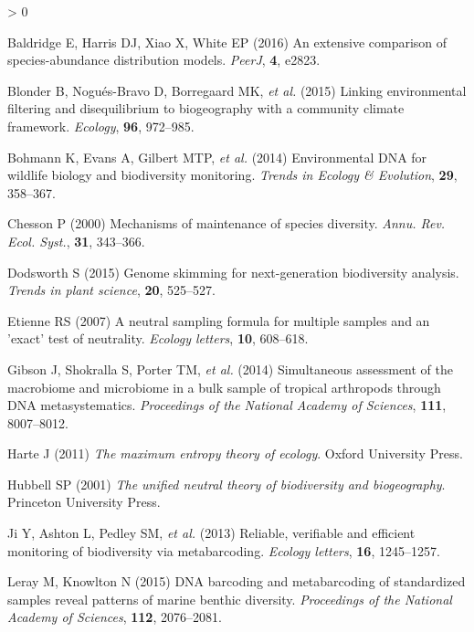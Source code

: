 \documentclass[
]{article}
\newlength{\cslhangindent}
\newenvironment{CSLReferences}[2] %
 {%
  \setlength{\parindent}{0pt}
  \ifodd #1 \everypar{\setlength{\hangindent}{\cslhangindent}}\ignorespaces\fi
  \ifnum #2 > 0
  \setlength{\parskip}{#2\baselineskip}
  \fi
 }%
 {}
\begin{document}
\hypertarget{refs}{}
\begin{CSLReferences}{1}{0}
\leavevmode\hypertarget{ref-baldridge2016}{}%
Baldridge E, Harris DJ, Xiao X, White EP (2016) An extensive comparison
of species-abundance distribution models. \emph{PeerJ}, \textbf{4},
e2823.

\leavevmode\hypertarget{ref-blonder2015}{}%
Blonder B, Nogués-Bravo D, Borregaard MK, \emph{et al.} (2015) Linking
environmental filtering and disequilibrium to biogeography with a
community climate framework. \emph{Ecology}, \textbf{96}, 972--985.

\leavevmode\hypertarget{ref-bohmann2014}{}%
Bohmann K, Evans A, Gilbert MTP, \emph{et al.} (2014) Environmental DNA
for wildlife biology and biodiversity monitoring. \emph{Trends in
Ecology \& Evolution}, \textbf{29}, 358--367.

\leavevmode\hypertarget{ref-chesson2000}{}%
Chesson P (2000) Mechanisms of maintenance of species diversity.
\emph{Annu. Rev. Ecol. Syst.}, \textbf{31}, 343--366.

\leavevmode\hypertarget{ref-dodsworth2015}{}%
Dodsworth S (2015) Genome skimming for next-generation biodiversity
analysis. \emph{Trends in plant science}, \textbf{20}, 525--527.

\leavevmode\hypertarget{ref-etienne2007}{}%
Etienne RS (2007) A neutral sampling formula for multiple samples and an
'exact' test of neutrality. \emph{Ecology letters}, \textbf{10},
608--618.

\leavevmode\hypertarget{ref-gibson2014}{}%
Gibson J, Shokralla S, Porter TM, \emph{et al.} (2014) Simultaneous
assessment of the macrobiome and microbiome in a bulk sample of tropical
arthropods through DNA metasystematics. \emph{Proceedings of the
National Academy of Sciences}, \textbf{111}, 8007--8012.

\leavevmode\hypertarget{ref-harte2011}{}%
Harte J (2011) \emph{The maximum entropy theory of ecology}. Oxford
University Press.

\leavevmode\hypertarget{ref-hubbell2001}{}%
Hubbell SP (2001) \emph{The unified neutral theory of biodiversity and
biogeography}. Princeton University Press.

\leavevmode\hypertarget{ref-ji2013}{}%
Ji Y, Ashton L, Pedley SM, \emph{et al.} (2013) Reliable, verifiable and
efficient monitoring of biodiversity via metabarcoding. \emph{Ecology
letters}, \textbf{16}, 1245--1257.

\leavevmode\hypertarget{ref-leray2015}{}%
Leray M, Knowlton N (2015) DNA barcoding and metabarcoding of
standardized samples reveal patterns of marine benthic diversity.
\emph{Proceedings of the National Academy of Sciences}, \textbf{112},
2076--2081.


\end{CSLReferences}
\end{document}
